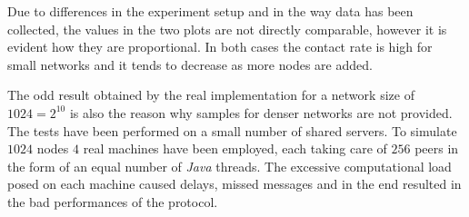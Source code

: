 Due to differences in the experiment setup and in the way data has been
collected, the values in the two plots are not directly comparable,
however it is evident how they are proportional. In both cases the \cloud
contact rate is high for small networks and it tends to decrease as
more nodes are added.

The odd result obtained by the real implementation for a network size
of $1024 = 2^{10}$ is also the reason why samples for
denser networks are not provided. The tests have been performed on a
small number of shared servers. To simulate $1024$ nodes $4$ real
machines have been employed, each
taking care of $256$ peers in the form of an equal number of
\emph{Java} threads. The excessive computational load posed on each
machine caused delays, missed messages and in the end resulted in the
bad performances of the protocol.
